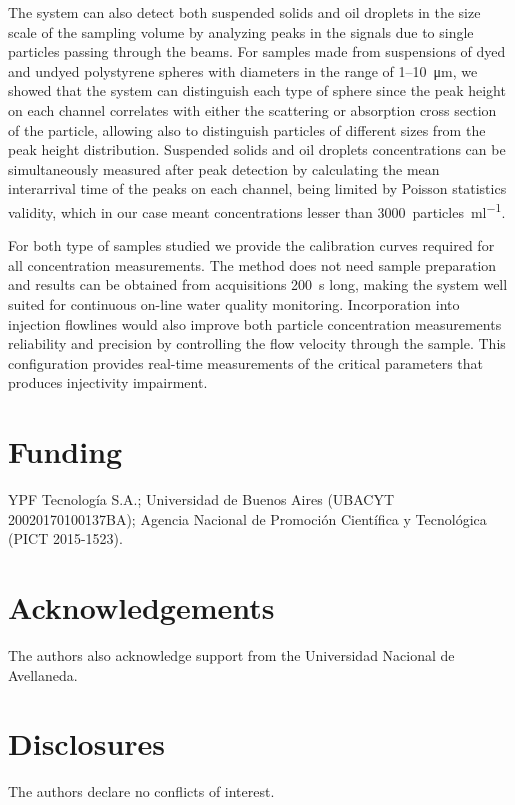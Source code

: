 \documentclass[9pt,twocolumn,twoside]{osajnl}
\begin{document}
The system can also detect both suspended solids and oil droplets in the size scale of the sampling volume by analyzing peaks in the signals due to single particles passing through the beams. For samples made from suspensions of dyed and undyed polystyrene spheres with diameters in the range of \SI{1}{}--\SI{10}{\micro\metre}, we showed that the system can distinguish each type of sphere since the peak height on each channel correlates with either the scattering or absorption cross section of the particle, allowing also to distinguish particles of different sizes from the peak height distribution. Suspended solids and oil droplets concentrations can be simultaneously measured after peak detection by calculating the mean interarrival time of the peaks on each channel, being limited by Poisson statistics validity, which in our case meant concentrations lesser than \SI{3000}{particles\per\milli\litre}.

For both type of samples studied we provide the calibration curves required for all concentration measurements. The method does not need sample preparation and results can be obtained from acquisitions \SI{200}{\second} long, making the system well suited for continuous on-line water quality monitoring. Incorporation into injection flowlines would also improve both particle concentration measurements reliability and precision by controlling the flow velocity through the sample. This configuration provides real-time measurements of the critical parameters that produces injectivity impairment.





\section*{Funding}
YPF Tecnología S.A.; Universidad de Buenos Aires (UBACYT 20020170100137BA); Agencia Nacional de Promoción Científica y Tecnológica (PICT 2015-1523).


\section*{Acknowledgements}
The authors also acknowledge support from the Universidad Nacional de Avellaneda.


\section*{Disclosures}
The authors declare no conflicts of interest.
\end{document}
